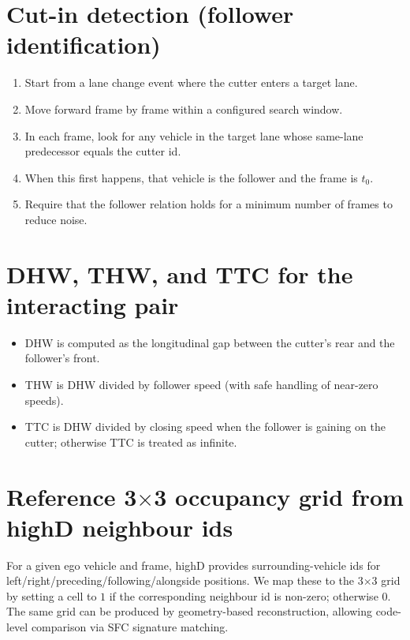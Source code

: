 \documentclass[12pt,a4paper,twoside,openright]{report}
\begin{document}
    \section{Cut-in detection (follower identification)}
    \begin{enumerate}[leftmargin=1.6em]
  \item Start from a lane change event where the cutter enters a target lane.
  \item Move forward frame by frame within a configured search window.
  \item In each frame, look for any vehicle in the target lane whose same-lane predecessor equals the cutter id.
  \item When this first happens, that vehicle is the follower and the frame is $t_0$.
  \item Require that the follower relation holds for a minimum number of frames to reduce noise.
    \end{enumerate}

    \section{DHW, THW, and TTC for the interacting pair}
    \begin{itemize}[leftmargin=1.2em]
  \item DHW is computed as the longitudinal gap between the cutter's rear and the follower's front.
  \item THW is DHW divided by follower speed (with safe handling of near-zero speeds).
  \item TTC is DHW divided by closing speed when the follower is gaining on the cutter; otherwise TTC is treated as infinite.
    \end{itemize}

    \section{\texorpdfstring{Reference 3$\times$3}{Reference 3x3} occupancy grid from highD neighbour ids}
    For a given ego vehicle and frame, highD provides surrounding-vehicle ids for left/right/preceding/following/alongside positions. We map these to the 3$\times$3 grid by setting a cell to $1$ if the corresponding neighbour id is non-zero; otherwise $0$. The same grid can be produced by geometry-based reconstruction, allowing code-level comparison via SFC signature matching.
\end{document}
